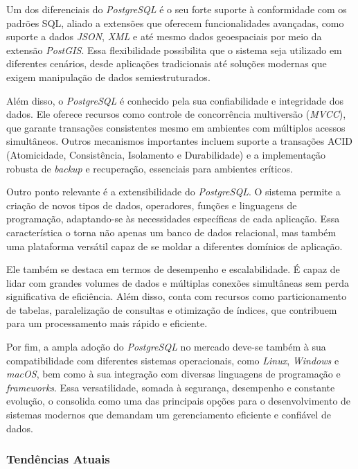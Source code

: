 \documentclass[english,brazilian]{UNISINOSartigo} %
\begin{document}
Um dos diferenciais do \textit{PostgreSQL} é o seu forte suporte à conformidade com os padrões SQL, aliado a extensões que oferecem funcionalidades avançadas, como suporte a dados \textit{JSON}, \textit{XML} e até mesmo dados geoespaciais por meio da extensão \textit{PostGIS}. Essa flexibilidade possibilita que o sistema seja utilizado em diferentes cenários, desde aplicações tradicionais até soluções modernas que exigem manipulação de dados semiestruturados.

Além disso, o \textit{PostgreSQL} é conhecido pela sua confiabilidade e integridade dos dados. Ele oferece recursos como controle de concorrência multiversão (\textit{MVCC}), que garante transações consistentes mesmo em ambientes com múltiplos acessos simultâneos. Outros mecanismos importantes incluem suporte a transações ACID (Atomicidade, Consistência, Isolamento e Durabilidade) e a implementação robusta de \textit{backup} e recuperação, essenciais para ambientes críticos.

Outro ponto relevante é a extensibilidade do \textit{PostgreSQL}. O sistema permite a criação de novos tipos de dados, operadores, funções e linguagens de programação, adaptando-se às necessidades específicas de cada aplicação. Essa característica o torna não apenas um banco de dados relacional, mas também uma plataforma versátil capaz de se moldar a diferentes domínios de aplicação.

Ele também se destaca em termos de desempenho e escalabilidade. É capaz de lidar com grandes volumes de dados e múltiplas conexões simultâneas sem perda significativa de eficiência. Além disso, conta com recursos como particionamento de tabelas, paralelização de consultas e otimização de índices, que contribuem para um processamento mais rápido e eficiente.

Por fim, a ampla adoção do \textit{PostgreSQL} no mercado deve-se também à sua compatibilidade com diferentes sistemas operacionais, como \textit{Linux}, \textit{Windows} e \textit{macOS}, bem como à sua integração com diversas linguagens de programação e \textit{frameworks}. Essa versatilidade, somada à segurança, desempenho e constante evolução, o consolida como uma das principais opções para o desenvolvimento de sistemas modernos que demandam um gerenciamento eficiente e confiável de dados.

\subsubsection{Tendências Atuais}
\end{document}
